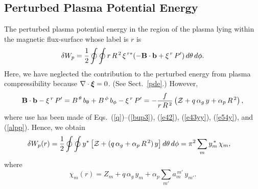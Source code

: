 \documentclass[12pt,prb,aps]{revtex4-1}
\newcommand {\bxi}{\mbox{\boldmath$\xi$}}
\begin{document}
\subsection{Perturbed Plasma Potential Energy}
The perturbed plasma potential energy in the region of the plasma lying within the magnetic flux-surface whose label is $r$ is\,\cite{tj1,gs1}
\begin{equation}
\delta W_p = \frac{1}{2}\oint\oint r\,R^{\,2}\,\xi^{\,r\ast}(-{\bf B}\cdot{\bf b} + \xi^{\,r}\,P')\,d\theta\,d\phi.
\end{equation}
Here, we have neglected the contribution to the perturbed energy from plasma compressibility because $\nabla\cdot\bxi= 0$. (See Sect.~\ref{pde}.)
However,
\begin{equation}
{\bf B}\cdot{\bf b} -\xi^{\,r}\,P' = B^{\,\theta}\,b_\theta+B^{\,\phi}\,b_\phi - \xi^{\,r}\,P'
= - \frac{f}{r\,R^{\,2}}\left({\cal Z} + q\,\alpha_g\,y + \alpha_p\,R^{\,2}\right),
\end{equation}
where use has been made of Eqs.~(\ref{q})--(\ref{bup3}), (\ref{e42}), (\ref{e43yy}), (\ref{e54y}),  and (\ref{alpp}). Hence,
we obtain
\begin{align}\label{e87j}
\delta W_p(r) &=\frac{1}{2}\oint\oint y^{\ast}\left[{\cal Z} + (q\,\alpha_g + \alpha_p\,R^{\,2})\,y\right]d\theta\,d\phi= \pi^2\sum_{m}y_m^{\,\ast}\,\chi_m,
\end{align}
where 
\begin{equation}\label{chidef}
\chi_m(r)=Z_m + q\,\alpha_g\,y_m + \alpha_p\sum_{m'} a_m^{\,m'}\,y_{m'}.
\end{equation}

\end{document}
